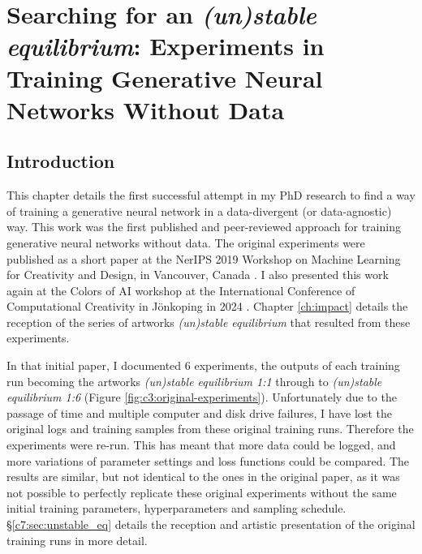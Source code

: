 \chapter{Searching for an \textit{(un)stable equilibrium}:
Experiments in Training Generative Neural Networks Without Data}
\label{ch:unstable_eq}

\section{Introduction}

This chapter details the first successful attempt in my PhD research to find a way of training a generative neural network in a data-divergent (or data-agnostic) way. 
This work was the first published and peer-reviewed approach for training generative neural networks without data.
The original experiments were published as a short paper at the NerIPS 2019 Workshop on Machine Learning for Creativity and Design, in Vancouver, Canada \citep{broad2019searching}. 
I also presented this work again at the Colors of AI workshop at the International Conference of Computational Creativity in Jönkoping in 2024 \citep{riccio2024colours}.
Chapter \ref{ch:impact} details the reception of the series of artworks \textit{(un)stable equilibrium} that resulted from these experiments. 

In that initial paper, I documented 6 experiments, the outputs of each training run becoming the artworks \textit{(un)stable equilibrium 1:1} through to \textit{(un)stable equilibrium 1:6} (Figure \ref{fig:c3:original-experiments}). 
Unfortunately due to the passage of time and multiple computer and disk drive failures, I have lost the original logs and training samples from these original training runs. 
Therefore the experiments were re-run.
This has meant that more data could be logged, and more variations of parameter settings and loss functions could be compared.
The results are similar, but not identical to the ones in the original paper, as it was not possible to perfectly replicate these original experiments without the same initial training parameters, hyperparameters and sampling schedule. 
\S \ref{c7:sec:unstable_eq} details the reception and artistic presentation of the original training runs in more detail. 

